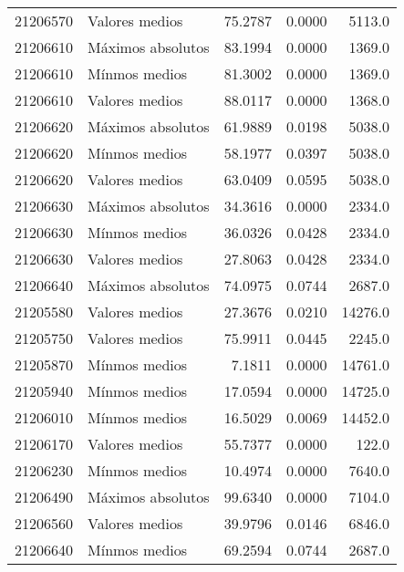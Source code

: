 \begin{longtable}{llrrr}
 21206570 &     Valores medios &       75.2787 &         0.0000 &          5113.0 \\
 21206610 &  Máximos absolutos &       83.1994 &         0.0000 &          1369.0 \\
 21206610 &      Mínmos medios &       81.3002 &         0.0000 &          1369.0 \\
 21206610 &     Valores medios &       88.0117 &         0.0000 &          1368.0 \\
 21206620 &  Máximos absolutos &       61.9889 &         0.0198 &          5038.0 \\
 21206620 &      Mínmos medios &       58.1977 &         0.0397 &          5038.0 \\
 21206620 &     Valores medios &       63.0409 &         0.0595 &          5038.0 \\
 21206630 &  Máximos absolutos &       34.3616 &         0.0000 &          2334.0 \\
 21206630 &      Mínmos medios &       36.0326 &         0.0428 &          2334.0 \\
 21206630 &     Valores medios &       27.8063 &         0.0428 &          2334.0 \\
 21206640 &  Máximos absolutos &       74.0975 &         0.0744 &          2687.0 \\
 21205580 &     Valores medios &       27.3676 &         0.0210 &         14276.0 \\
 21205750 &     Valores medios &       75.9911 &         0.0445 &          2245.0 \\
 21205870 &      Mínmos medios &        7.1811 &         0.0000 &         14761.0 \\
 21205940 &      Mínmos medios &       17.0594 &         0.0000 &         14725.0 \\
 21206010 &      Mínmos medios &       16.5029 &         0.0069 &         14452.0 \\
 21206170 &     Valores medios &       55.7377 &         0.0000 &           122.0 \\
 21206230 &      Mínmos medios &       10.4974 &         0.0000 &          7640.0 \\
 21206490 &  Máximos absolutos &       99.6340 &         0.0000 &          7104.0 \\
 21206560 &     Valores medios &       39.9796 &         0.0146 &          6846.0 \\
 21206640 &      Mínmos medios &       69.2594 &         0.0744 &          2687.0 \\

\end{longtable}
